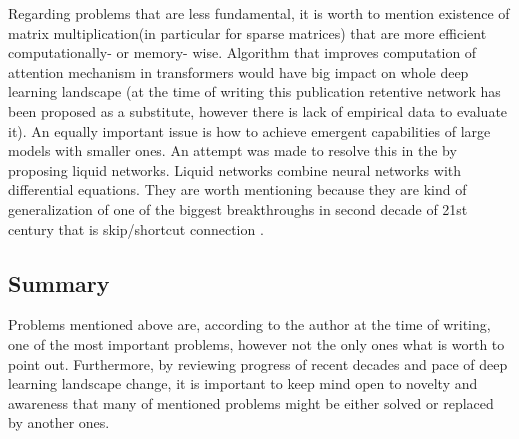 \documentclass[10pt]{article}
\begin{document}
Regarding problems that are less fundamental, it is worth to mention existence of matrix multiplication(in particular for sparse matrices) that are more efficient computationally- or memory- wise. Algorithm that improves computation of attention mechanism in transformers \cite{transformery} would have big impact on whole deep learning landscape (at the time of writing this publication retentive network \cite{ret_net} has been proposed as a substitute, however there is lack of empirical data to evaluate it). An equally important issue is how to achieve emergent capabilities of large models with smaller ones. An attempt was made to resolve this in the \cite{liquid_net} by proposing liquid networks. Liquid networks combine neural networks with differential equations. They are worth mentioning because they are kind of generalization of one of the biggest breakthroughs in second decade of 21st century that is skip/shortcut connection  \cite{resnet_block}.

\subsection{Summary}
Problems mentioned above are, according to the author at the time of writing, one of the most important problems, however not the only ones what is worth to point out.  Furthermore, by reviewing progress of recent decades and pace of deep learning landscape change, it is important to keep mind open to novelty and awareness that many of mentioned problems might be either solved or replaced by another ones.



\nocite{*}
\end{document}

